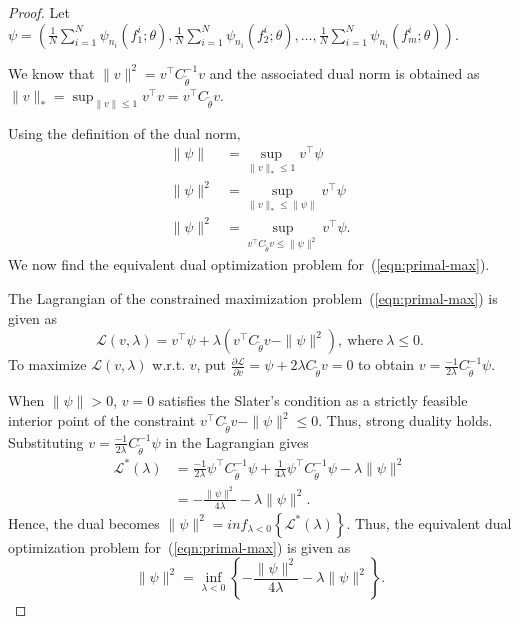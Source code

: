 \documentclass[10pt,a4paper]{amsart}
\def\gL{{\mathcal{L}}}
\begin{document}
\begin{proof}
Let $\psi=(\frac{1}{N}\sum_{i=1}^{N}\psi_{n_i}(f_1^i;\theta), \frac{1}{N}\sum_{i=1}^{N}\psi_{n_i}(f_2^i;\theta), \dots, \frac{1}{N}\sum_{i=1}^{N}\psi_{n_i}(f_m^i;\theta))$.

We know that $\|v\|^2= v^\top C_{\tilde{\theta}}^{-1}v$ and the associated dual norm is obtained as $\|v\|_*= \sup_{\|v\|\leq 1} v^\top v= v^\top C_{\tilde{\theta}}v$.

Using the definition of the dual norm,
    \begin{align}
        \|\psi\|&=  \sup_{\|v\|_*\leq 1} v^\top \psi\nonumber\\
        \|\psi\|^2&=  \sup_{\|v\|_*\leq \|\psi\|} v^\top \psi\nonumber\\
        \|\psi\|^2&=  \sup_{v^\top C_{\tilde{\theta}}v \leq \|\psi\|^2} v^\top \psi\label{eqn:primal-max}.
    \end{align}
    We now find the equivalent dual optimization problem for~(\ref{eqn:primal-max}).
    
    The Lagrangian of the constrained maximization problem~(\ref{eqn:primal-max}) is given as
    \begin{equation*}
        \gL(v,\lambda)= v^\top \psi+\lambda(v^\top C_{\tilde{\theta}}v - \|\psi\|^2),~\text{where}~\lambda \le 0.
    \end{equation*} 
    To maximize $ \gL(v,\lambda)$ w.r.t. $v$, put $\frac{   \partial\gL}{\partial v}= \psi+2\lambda C_{\tilde{\theta}}v=0$ to obtain $v=\frac{-1}{2\lambda}C_{\tilde{\theta}}^{-1}\psi.$

    When $\|\psi\|> 0$, $v=0$ satisfies the Slater's condition as a strictly feasible interior point of the constraint $v^\top C_{\tilde{\theta}}v - \|\psi\|^2\leq 0$. Thus, strong duality holds.
    Substituting $v=\frac{-1}{2\lambda}C_{\tilde{\theta}}^{-1}\psi$ in the Lagrangian gives
     \begin{align*}
        \gL^*(\lambda)&= \frac{-1}{2\lambda}{\psi}^\top C_{\tilde{\theta}}^{-1}\psi+\frac{1}{4\lambda}{\psi}^\top C_{\tilde{\theta}}^{-1}\psi - \lambda\|\psi\|^2\\
       &= -\frac{\|\psi\|^2}{4\lambda} - \lambda\|\psi\|^2 .
    \end{align*}
    Hence, the dual becomes $\|\psi\|^2=inf_{\lambda <0}\left\{ \gL^*(\lambda)\right\}$. Thus, the equivalent dual optimization problem for~(\ref{eqn:primal-max}) is given as
    \begin{equation}
        \|\psi\|^2=\inf_{\lambda <0}\left\{-\frac{\|\psi\|^2}{4\lambda} - \lambda\|\psi\|^2 \right\}.
    \end{equation}


\end{proof}
\end{document}
